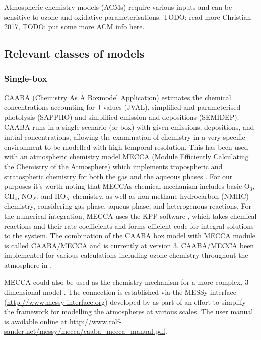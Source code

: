     Atmospheric chemistry models (ACMs) require various inputs and can be sensitive to ozone and oxidative parameterisations. 
    TODO: read more Christian 2017,
    TODO: put some more ACM info here.
    
  \subsection{Relevant classes of models}
    \subsubsection{Single-box} %
      
      CAABA (Chemistry As A Boxmodel Application) estimates the chemical concentrations accounting for J-values (JVAL), simplified and parameterised photolysis (SAPPHO) and simplified emission and depositions (SEMIDEP).
    CAABA runs in a single scenario (or box) with given emissions, depositions, and initial concentrations, allowing the examination of chemistry in a very specific environment to be modelled with high temporal resolution.
    This has been used with an atmospheric chemistry model MECCA (Module Efficiently Calculating the Chemistry of the Atmosphere) which implements tropospheric and stratospheric chemistry for both the gas and the aqueous phases \citep{Sander2005}.
    For our purposes it's worth noting that MECCAs chemical mechanism includes basic O$_3$, CH$_4$, NO$_X$, and HO$_X$ chemistry, as well as non methane hydrocarbon (NMHC) chemistry, considering gas phase, aqueus phase, and heterogenous reactions. \citep{Sander2005}
    For the numerical integration, MECCA uses the KPP software \citep{SanduSander2006}, which takes chemical reactions and their rate coefficients and forms efficient code for integral solutions to the system.
    The combination of the CAABA box model with MECCA module is called CAABA/MECCA and is currently at version 3.
    CAABA/MECCA been implemented for various calculations including ozone chemistry throughout the atmosphere in \cite{Zanis2014}.

    MECCA could also be used as the chemistry mechanism for a more complex, 3-dimensional model \citep[e.g.][]{Jockel2006}.
    The connection is established via the MESSy interface (\url{http://www.messy-interface.org}) developed by \cite{Jockel2005} as part of an effort to simplify the framework for modelling the atmospheres at various scales.
    The user manual is available online at \url{http://www.rolf-sander.net/messy/mecca/caaba_mecca_manual.pdf}.

